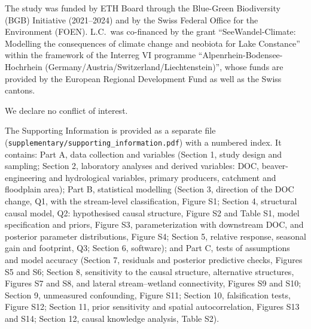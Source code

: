 \documentclass[pdflatex,sn-nature]{sn-jnl}   %
\begin{document}

The study was funded by ETH Board through the Blue-Green Biodiversity (BGB) Initiative (2021--2024) and by the Swiss Federal Office for the Environment (FOEN). L.C.\ was co-financed by the grant ``SeeWandel-Climate: Modelling the consequences of climate change and neobiota for Lake Constance'' within the framework of the Interreg VI programme ``Alpenrhein-Bodensee-Hochrhein (Germany/Austria/Switzerland/Liechtenstein)'', whose funds are provided by the European Regional Development Fund as well as the Swiss cantons.


We declare no conflict of interest.

The Supporting Information is provided as a separate file (\texttt{supplementary/supporting\_information.pdf}) with a numbered index. It contains: Part A, data collection and variables (Section 1, study design and sampling; Section 2, laboratory analyses and derived variables: DOC, beaver-engineering and hydrological variables, primary producers, catchment and floodplain area); Part B, statistical modelling (Section 3, direction of the DOC change, Q1, with the stream-level classification, Figure S1; Section 4, structural causal model, Q2: hypothesised causal structure, Figure S2 and Table S1, model specification and priors, Figure S3, parameterization with downstream DOC, and posterior parameter distributions, Figure S4; Section 5, relative response, seasonal gain and footprint, Q3; Section 6, software); and Part C, tests of assumptions and model accuracy (Section 7, residuals and posterior predictive checks, Figures S5 and S6; Section 8, sensitivity to the causal structure, alternative structures, Figures S7 and S8, and lateral stream--wetland connectivity, Figures S9 and S10; Section 9, unmeasured confounding, Figure S11; Section 10, falsification tests, Figure S12; Section 11, prior sensitivity and spatial autocorrelation, Figures S13 and S14; Section 12, causal knowledge analysis, Table S2).


\end{document}
